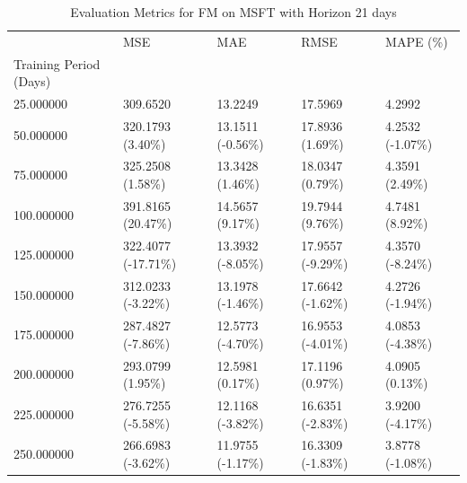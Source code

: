 \begin{table}
\caption{Evaluation Metrics for FM on MSFT with Horizon 21 days}
\label{tab:fm_MSFT_h21_metrics}
\begin{tabular}{lllll}
\toprule
 & MSE & MAE & RMSE & MAPE (\%) \\
Training Period (Days) &  &  &  &  \\
\midrule
25.000000 & 309.6520 & 13.2249 & 17.5969 & 4.2992 \\
50.000000 & 320.1793 (3.40\%) & 13.1511 (-0.56\%) & 17.8936 (1.69\%) & 4.2532 (-1.07\%) \\
75.000000 & 325.2508 (1.58\%) & 13.3428 (1.46\%) & 18.0347 (0.79\%) & 4.3591 (2.49\%) \\
100.000000 & 391.8165 (20.47\%) & 14.5657 (9.17\%) & 19.7944 (9.76\%) & 4.7481 (8.92\%) \\
125.000000 & 322.4077 (-17.71\%) & 13.3932 (-8.05\%) & 17.9557 (-9.29\%) & 4.3570 (-8.24\%) \\
150.000000 & 312.0233 (-3.22\%) & 13.1978 (-1.46\%) & 17.6642 (-1.62\%) & 4.2726 (-1.94\%) \\
175.000000 & 287.4827 (-7.86\%) & 12.5773 (-4.70\%) & 16.9553 (-4.01\%) & 4.0853 (-4.38\%) \\
200.000000 & 293.0799 (1.95\%) & 12.5981 (0.17\%) & 17.1196 (0.97\%) & 4.0905 (0.13\%) \\
225.000000 & 276.7255 (-5.58\%) & 12.1168 (-3.82\%) & 16.6351 (-2.83\%) & 3.9200 (-4.17\%) \\
250.000000 & 266.6983 (-3.62\%) & 11.9755 (-1.17\%) & 16.3309 (-1.83\%) & 3.8778 (-1.08\%) \\
\bottomrule
\end{tabular}
\end{table}
